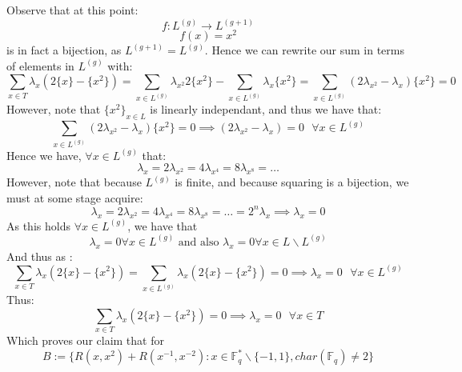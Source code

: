 \documentclass[11pt]{article}
\theoremstyle{plain}
\theoremstyle{definition}
\begin{document}
Observe that at this point:
\begin{equation*}
f: L^{(g)} \rightarrow L^{(g+1)}
\end{equation*}
\begin{equation*}
f(x) = x^2
\end{equation*}
is in fact a bijection, as $L^{(g+1)} = L^{(g)}$. Hence we can rewrite our sum in terms of elements in $L^{(g)}$ with:
\begin{equation*}
\sum_{x \in T} \lambda_x (2\{x\} - \{x^2\}) =  \sum_{x \in L^{(g)}} \lambda_{x^2} 2\{x^2\} -  \sum_{x \in L^{(g)}} \lambda_x \{x^2\} = \sum_{x \in L^{(g)}} (2 \lambda_{x^2}  - \lambda_x ) \{x^2\} = 0
\end{equation*}
However, note that  $\{x^2\}_{x\in L}$ is linearly independant, and thus we have that:
\begin{equation*}
\sum_{x \in L^{(g)}} (2 \lambda_{x^2}  - \lambda_x ) \{x^2\} = 0 \implies (2 \lambda_{x^2}  - \lambda_x ) = 0 \text{ } \forall x \in L^{(g)}
\end{equation*}
Hence we have, $\forall x \in L^{(g)}$ that:
\begin{equation*}
\lambda_x = 2 \lambda_{x^2} = 4 \lambda_{x^4} = 8 \lambda_{x^8} = \ldots
\end{equation*}
However, note that because $L^{(g)}$ is finite, and because squaring is a bijection, we must at some stage acquire:
\begin{equation*}
\lambda_x = 2 \lambda_{x^2} = 4 \lambda_{x^4} = 8 \lambda_{x^8} = \ldots = 2^n \lambda_x \implies \lambda_x =0
\end{equation*}
As this holds $\forall x \in L^{(g)}$, we have that
\begin{equation*}
\lambda_x =0 \forall x \in L^{(g)} \text{ and also } \lambda_x =0 \forall x \in L \backslash L^{(g)}
\end{equation*}
And thus as :
\begin{equation*}
\sum_{x \in T} \lambda_x (2\{x\} - \{x^2\}) =  \sum_{x \in L^{(g)}} \lambda_x (2\{x\} - \{x^2\})=0 \implies  \lambda_x =0 \text{ }\forall x \in L^{(g)}
\end{equation*}
Thus:
\begin{equation*}
\sum_{x \in T} \lambda_x (2\{x\} - \{x^2\}) =0 \implies  \lambda_x =0 \text{ }\forall x \in T
\end{equation*}
Which proves our claim that for
\begin{equation*}
B := \{ R(x, x^2) + R(x^{-1},x^{-2}) : x \in \mathbb{F}_q ^* \backslash \{-1,1\}, char(\mathbb{F}_q) \neq 2 \} 
\end{equation*}
\end{document}
